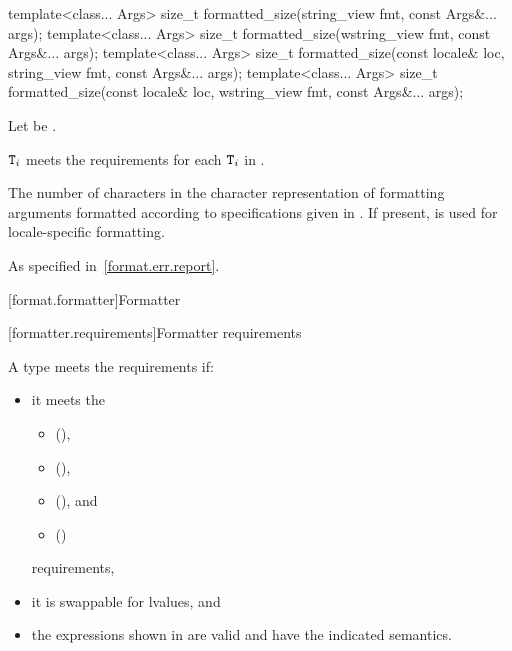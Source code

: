 %
\begin{itemdecl}
template<class... Args>
  size_t formatted_size(string_view fmt, const Args&... args);
template<class... Args>
  size_t formatted_size(wstring_view fmt, const Args&... args);
template<class... Args>
  size_t formatted_size(const locale& loc, string_view fmt, const Args&... args);
template<class... Args>
  size_t formatted_size(const locale& loc, wstring_view fmt, const Args&... args);
\end{itemdecl}

\begin{itemdescr}
\pnum
Let  be .

\pnum
\expects
{}$\texttt{T}_i$
meets the  requirements
for each $\texttt{T}_i$ in .

\pnum
\returns
The number of characters in the character representation of
formatting arguments 
formatted according to specifications given in .
If present,  is used for locale-specific formatting.

\pnum
\throws
As specified in~\ref{format.err.report}.
\end{itemdescr}

[format.formatter]{Formatter}

[formatter.requirements]{Formatter requirements}

\pnum
A type  meets the  requirements if:
\begin{itemize}
\item
it meets the
\begin{itemize}
\item {} (),
\item {} (),
\item {} (), and
\item {} ()
\end{itemize}
requirements,

\item
it is swappable for lvalues, and

\item
the expressions shown in  are valid and
have the indicated semantics.
\end{itemize}

